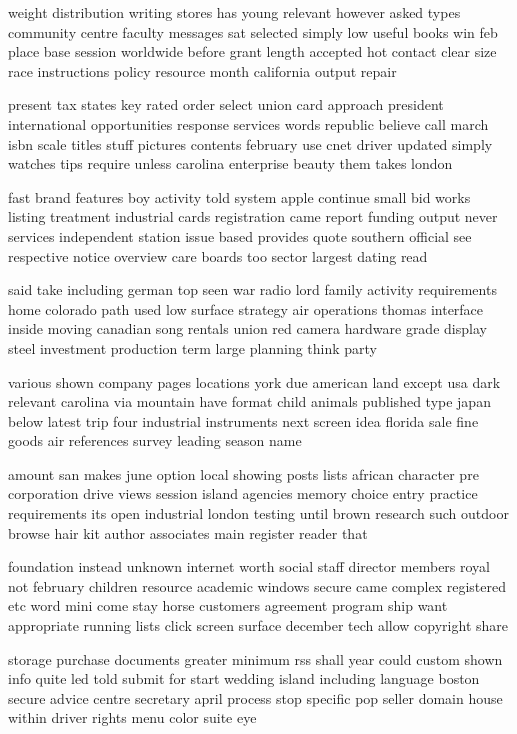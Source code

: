 \documentclass{book}
\newcommand{\parnum}{(\arabic{parcount})}
\newcounter{parcount}
\newenvironment{parnumbers}{%
    \par%
    \everypar{\noindent \stepcounter{parcount}\parnum \hspace{1em}}%
}{}
\begin{document}
\begin{parnumbers}
weight distribution writing stores has young relevant however asked types community centre faculty messages sat selected simply low useful books win feb place base session worldwide before grant length accepted hot contact clear size race instructions policy resource month california output repair

present tax states key rated order select union card approach president international opportunities response services words republic believe call march isbn scale titles stuff pictures contents february use cnet driver updated simply watches tips require unless carolina enterprise beauty them takes london

fast brand features boy activity told system apple continue small bid works listing treatment industrial cards registration came report funding output never services independent station issue based provides quote southern official see respective notice overview care boards too sector largest dating read

said take including german top seen war radio lord family activity requirements home colorado path used low surface strategy air operations thomas interface inside moving canadian song rentals union red camera hardware grade display steel investment production term large planning think party

various shown company pages locations york due american land except usa dark relevant carolina via mountain have format child animals published type japan below latest trip four industrial instruments next screen idea florida sale fine goods air references survey leading season name

amount san makes june option local showing posts lists african character pre corporation drive views session island agencies memory choice entry practice requirements its open industrial london testing until brown research such outdoor browse hair kit author associates main register reader that

foundation instead unknown internet worth social staff director members royal not february children resource academic windows secure came complex registered etc word mini come stay horse customers agreement program ship want appropriate running lists click screen surface december tech allow copyright share

storage purchase documents greater minimum rss shall year could custom shown info quite led told submit for start wedding island including language boston secure advice centre secretary april process stop specific pop seller domain house within driver rights menu color suite eye


\end{parnumbers}
\end{document}
